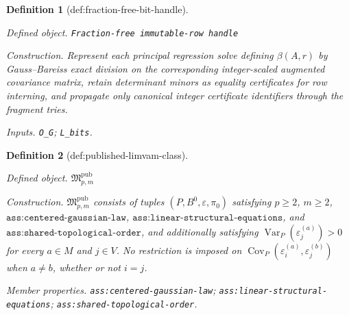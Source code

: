 \documentclass{article}
\newtheorem{definition}{Definition}
\begin{document}
\begin{definition}[def:fraction-free-bit-handle]\label{def:fraction-free-bit-handle}
\par\smallskip\noindent\emph{Defined object.} \texttt{Fraction-\allowbreak{}free immutable-\allowbreak{}row handle}
\par\smallskip\noindent\emph{Construction.} Represent each principal regression solve defining \(\beta(A,r)\) by Gauss--Bareiss exact division on the corresponding integer-scaled augmented covariance matrix, retain determinant minors as equality certificates for row interning, and propagate only canonical integer certificate identifiers through the fragment tries.
\par\smallskip\noindent\emph{Inputs.} \texttt{O\_\allowbreak{}G}; \texttt{L\_\allowbreak{}bits}.
\end{definition}

\begin{definition}[def:published-limvam-class]\label{def:published-limvam-class}
\par\smallskip\noindent\emph{Defined object.} \(\mathfrak M_{p,m}^{\mathrm{pub}}\)
\par\smallskip\noindent\emph{Construction.} \(\mathfrak M_{p,m}^{\mathrm{pub}}\) consists of tuples \((P,B^0,\varepsilon,\pi_0)\) satisfying \(p\geq2\), \(m\geq2\), \(\texttt{ass:centered-gaussian-law}\), \(\texttt{ass:linear-structural-equations}\), and \(\texttt{ass:shared-topological-order}\), and additionally satisfying \(\operatorname{Var}_P(\varepsilon_j^{(a)})>0\) for every \(a\in M\) and \(j\in V\). No restriction is imposed on \(\operatorname{Cov}_P(\varepsilon_i^{(a)},\varepsilon_j^{(b)})\) when \(a\ne b\), whether or not \(i=j\).
\par\smallskip\noindent\emph{Member properties.} \texttt{ass:\allowbreak{}centered-\allowbreak{}gaussian-\allowbreak{}law}; \texttt{ass:\allowbreak{}linear-\allowbreak{}structural-\allowbreak{}equations}; \texttt{ass:\allowbreak{}shared-\allowbreak{}topological-\allowbreak{}order}.
\end{definition}
\end{document}
